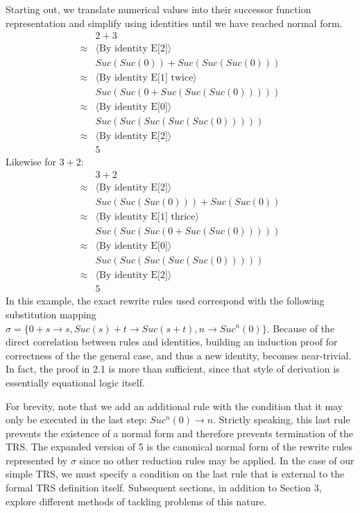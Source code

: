 \documentclass{article}
\begin{document}
Starting out, we translate numerical values into their successor function representation and simplify using identities until we have reached normal form.
\begin{align*}
    &2 + 3\\
    \approx& \langle \text{By identity E[2]} \rangle\\
    &Suc(Suc(0)) + Suc(Suc(Suc(0)))\\
    \approx& \langle \text{By identity E[1] twice} \rangle\\
    &Suc(Suc(0 + Suc(Suc(Suc(0)))))\\
    \approx& \langle \text{By identity E[0]} \rangle\\
    &Suc(Suc(Suc(Suc(Suc(0)))))\\
    \approx& \langle \text{By identity E[2]} \rangle\\
    &5
\end{align*}
Likewise for $3+2$:
\begin{align*}
    &3 + 2\\
    \approx& \langle \text{By identity E[2]} \rangle\\
    &Suc(Suc(Suc(0))) + Suc(Suc(0))\\
    \approx& \langle \text{By identity E[1] thrice} \rangle\\
    &Suc(Suc(Suc(0 + Suc(Suc(0)))))\\
    \approx& \langle \text{By identity E[0]} \rangle\\
    &Suc(Suc(Suc(Suc(Suc(0)))))\\
    \approx& \langle \text{By identity E[2]} \rangle\\
    &5
\end{align*}
In this example, the exact rewrite rules used correspond with the following substitution mapping
$\sigma = \{0 + s \rightarrow s, Suc(s) + t \rightarrow Suc(s + t), n \rightarrow Suc^n(0)\}$.
Because of the direct correlation between rules and identities, building an induction proof for correctness of the the general case,
and thus a new identity, becomes near-trivial. In fact, the proof in 2.1 is more than sufficient, since that style of derivation
is essentially equational logic itself.

For brevity, note that we add an additional rule with the condition that it may only be executed in the last step: $Suc^n(0) \rightarrow n$.
Strictly speaking, this last rule prevents the existence of a normal form and therefore prevents termination of the TRS.
The expanded version of 5 is the canonical normal form of the rewrite rules represented by $\sigma$ since no other reduction rules may be applied.
In the case of our simple TRS, we must specify a condition on the last rule that is external to the formal TRS definition itself.
Subsequent sections, in addition to Section 3, explore different methods of tackling problems of this nature.
\end{document}

